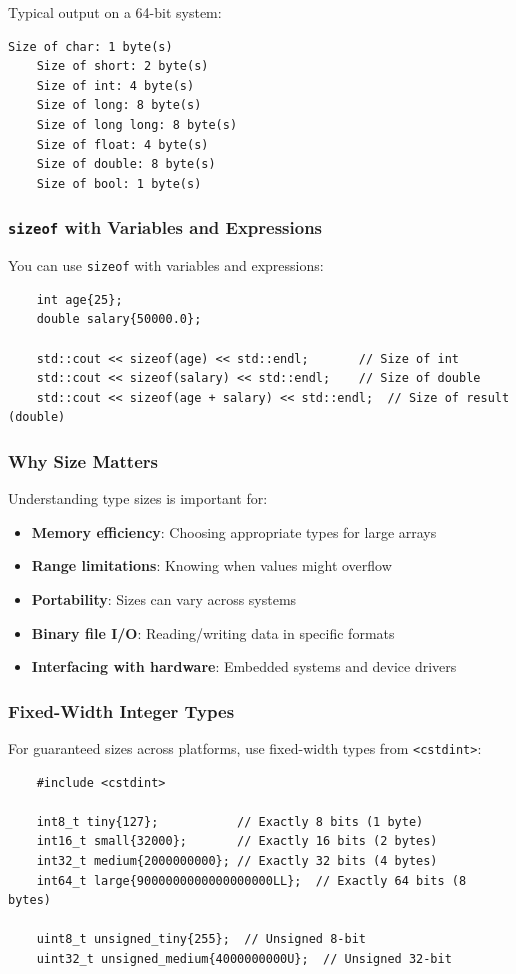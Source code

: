 Typical output on a 64-bit system:
\begin{lstlisting}[numbers=none]
	Size of char: 1 byte(s)
	Size of short: 2 byte(s)
	Size of int: 4 byte(s)
	Size of long: 8 byte(s)
	Size of long long: 8 byte(s)
	Size of float: 4 byte(s)
	Size of double: 8 byte(s)
	Size of bool: 1 byte(s)
\end{lstlisting}

\subsubsection{\texttt{sizeof} with Variables and Expressions}

You can use \texttt{sizeof} with variables and expressions:

\begin{lstlisting}
	int age{25};
	double salary{50000.0};
	
	std::cout << sizeof(age) << std::endl;       // Size of int
	std::cout << sizeof(salary) << std::endl;    // Size of double
	std::cout << sizeof(age + salary) << std::endl;  // Size of result (double)
\end{lstlisting}

\subsubsection{Why Size Matters}

Understanding type sizes is important for:
\begin{itemize}
	\item \textbf{Memory efficiency}: Choosing appropriate types for large arrays
	\item \textbf{Range limitations}: Knowing when values might overflow
	\item \textbf{Portability}: Sizes can vary across systems
	\item \textbf{Binary file I/O}: Reading/writing data in specific formats
	\item \textbf{Interfacing with hardware}: Embedded systems and device drivers
\end{itemize}

\subsubsection{Fixed-Width Integer Types}

For guaranteed sizes across platforms, use fixed-width types from \texttt{<cstdint>}:

\begin{lstlisting}
	#include <cstdint>
	
	int8_t tiny{127};           // Exactly 8 bits (1 byte)
	int16_t small{32000};       // Exactly 16 bits (2 bytes)
	int32_t medium{2000000000}; // Exactly 32 bits (4 bytes)
	int64_t large{9000000000000000000LL};  // Exactly 64 bits (8 bytes)
	
	uint8_t unsigned_tiny{255};  // Unsigned 8-bit
	uint32_t unsigned_medium{4000000000U};  // Unsigned 32-bit
\end{lstlisting}

